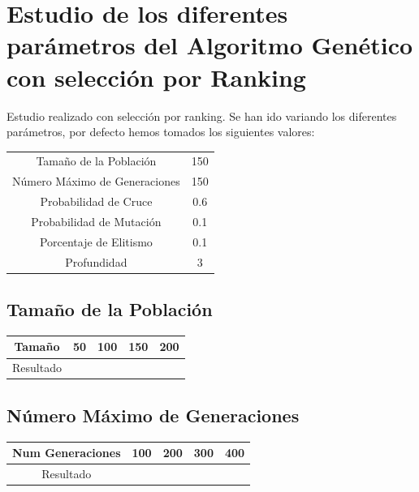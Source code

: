 \documentclass[12pt]{article}
\begin{document}
	


\section{Estudio de los diferentes parámetros del Algoritmo Genético con selección por Ranking}

	Estudio realizado con selección por ranking. Se han ido variando los diferentes parámetros, por defecto hemos tomados los siguientes valores:

\begin{table}[H]
\begin{center}
\begin{tabular}{|cc|} \hline
Tamaño de la Población   & 150  \\  
Número Máximo de Generaciones  &  150 \\
Probabilidad de Cruce & 0.6 \\
Probabilidad de Mutación & 0.1 \\
Porcentaje de Elitismo & 0.1 \\
Profundidad & 3 \\ \hline
\end{tabular}
\end{center}
\end{table}


\subsection{Tamaño de la Población}

\begin{table}[H]
\begin{center}
\begin{tabular}{|ccccc|} \hline
Tamaño	   & 50 & 100 & 150 & 200 \\  \hline
Resultado  &   &  &  &  \\ \hline
\end{tabular}
\end{center}
\end{table}

	

\subsection{Número Máximo de Generaciones}
\begin{table}[H]
\begin{center}
\begin{tabular}{|ccccc|} \hline
Num Generaciones  & 100 & 200 & 300 & 400 \\  \hline
Resultado  &   &  &  &  \\ \hline
\end{tabular}
\end{center}
\end{table}	
\end{document}
